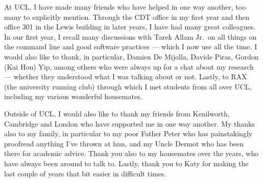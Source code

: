 \begin{acknowledgements}
	At UCL, I have made many friends who have helped in one way another, too many to explicitly mention.
	Through the CDT office in my first year and then office 301 in the Lewis building in later years, I have had many great colleagues.
	In our first year, I recall many discussions with Tarek Allam Jr.\ on all things on the command line and good software practices --- which I now use all the time.
	I would also like to thank, in particular, Damien De Mijolla, Davide Piras, Gordon (Kai Hou) Yip, among others who were always up for a chat about my research --- whether they understood what I was talking about or not.
	Lastly, to RAX (the university running club) through which I met students from all over UCL, including my various wonderful housemates.

	Outside of UCL, I would also like to thank my friends from Kenilworth, Cambridge and London who have supported me in one way another.
	My thanks also to my family, in particular to my poor Father Peter who has painstakingly proofread anything I've thrown at him, and my Uncle Dermot who has been there for academic advice.
	Thank you also to my housemates over the years, who have always been around to talk to.
	Lastly, thank you to Katy for making the last couple of years that bit easier in difficult times.
\end{acknowledgements}

\setcounter{tocdepth}{2}

\tableofcontents
\listoffigures
\listoftables
